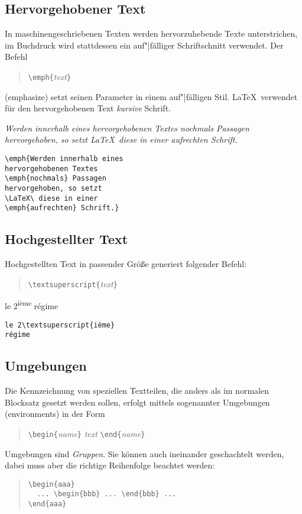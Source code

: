  
 
\subsection{Hervorgehobener Text}
 
In maschinengeschriebenen Texten werden hervorzuhebende Texte
unterstrichen, im Buchdruck wird stattdessen ein auf"|fälliger
Schriftschnitt verwendet.
Der Befehl 
\begin{quote}
\lstinline|\emph{|\textit{text}\lstinline|}| 
\end{quote}
(emphasize) setzt seinen Parameter in einem auf"|fälligen Stil.
\LaTeX\ verwendet für den hervorgehobenen Text \textit{kursive}
Schrift.

\exa 
\emph{Werden innerhalb eines hervorgehobenen Textes
\emph{nochmals} Passagen hervorgehoben, so setzt \LaTeX\ diese in
einer \emph{aufrechten} Schrift.}
\exb
\begin{verbatim}
\emph{Werden innerhalb eines 
hervorgehobenen Textes 
\emph{nochmals} Passagen
hervorgehoben, so setzt
\LaTeX\ diese in einer 
\emph{aufrechten} Schrift.}
\end{verbatim}
\exc


\subsection{Hochgestellter Text}
Hochgestellten Text in passender Größe generiert folgender Befehl:
\begin{quote}
\lstinline|\textsuperscript{|\textit{text}\lstinline|}|
\end{quote}
\exa
le 2\textsuperscript{ième} régime
\exb
\begin{verbatim}
le 2\textsuperscript{ième}
régime
\end{verbatim}
\exc




\subsection{Umgebungen} \label{env}

Die Kennzeichnung von speziellen Textteilen, die anders als im
normalen Blocksatz gesetzt werden sollen, erfolgt mittels
sogenannter Umgebungen (environments) in der Form
\begin{quote}
\lstinline|\begin{|\textit{name}\lstinline|}|\quad
   \textit{text}\quad
   \lstinline|\end{|\textit{name}\lstinline|}|
\end{quote}
Umgebungen sind \emph{Gruppen}.
Sie können auch ineinander geschachtelt werden, dabei muss aber
die richtige Reihenfolge beachtet werden:
\begin{quote}
\lstinline|\begin{aaa}|\\
\lstinline|  ... \begin{bbb} ... \end{bbb} ... |\\
\lstinline|\end{aaa}|
\end{quote}


